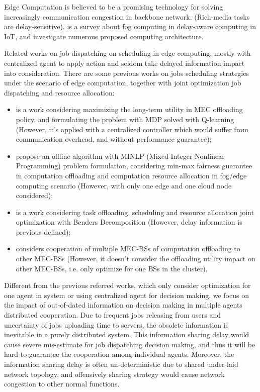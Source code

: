Edge Computation is believed to be a promising technology for solving increasingly communication congestion in backbone network.
(Rich-media tasks are delay-sensitive).
\cite{Naha2018} is a survey about fog computing in delay-aware computing in IoT, and investigate numerous proposed computing architecture.

Related works on job dispatching on scheduling in edge computing, mostly with centralized agent to apply action and seldom take delayed information impact into consideration.
There are some previous works on jobs scheduling strategies under the scenario of edge computation, together with joint optimization job dispatching and resource allocation:
\begin{itemize}
    \item \cite{Zheng2019} is a work considering maximizing the long-term utility in MEC offloading policy, and formulating the problem with MDP solved with Q-learning (However, it's applied with a centralized controller which would suffer from communication overhead, and without performance guarantee);
    \item \cite{Du2018} propose an offline algorithm with MINLP (Mixed-Integer Nonlinear Programming) problem formulation, considering min-max fairness guarantee in computation offloading and computation resource allocation in fog/edge computing scenario (However, with only one edge and one cloud node considered);
    \item \cite{Alameddine2019} is a work considering task offloading, scheduling and resource allocation joint optimization with Benders Decomposition (However, delay information is previous defined);
    \item \cite{Fan2017} considers cooperation of multiple MEC-BSs of computation offloading to other MEC-BSs (However, it doesn't consider the offloading utility impact on other MEC-BSs, i.e. only optimize for one BSs in the cluster).
\end{itemize}


Different from the previous referred works, which only consider optimization for one agent in system or using centralized agent for decision making, we focus on the impact of out-of-dated information on decision making in multiple agents distributed cooperation.
Due to frequent jobs releasing from users and uncertainty of jobs uploading time to servers, the obsolete information is inevitable in a purely distributed system.
This information sharing delay would cause severe mis-estimate for job dispatching decision making, and thus it will be hard to guarantee the cooperation among individual agents.
Moreover, the information sharing delay is often un-deterministic due to shared under-laid network topology, and offensively sharing strategy would cause network congestion to other normal functions.


